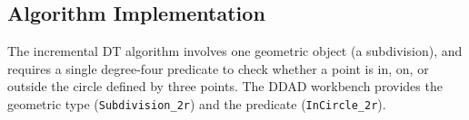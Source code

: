 % 
% 
% 
% 


\subsection{Algorithm Implementation}

The incremental DT algorithm involves one geometric object (a subdivision), and
requires a single degree-four predicate to check whether a point is in, on, or
outside the circle defined by three points. The DDAD workbench provides the
geometric type (\texttt{Subdivision\_2r}) and the predicate
(\texttt{InCircle\_2r}). 

